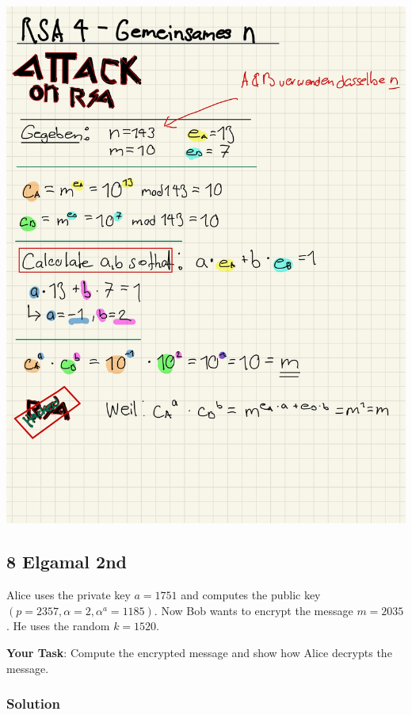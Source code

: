 \documentclass[11pt]{article}
\begin{document}
\begin{center}
	\includegraphics[scale=0.8]{img/psol5.jpg}
\end{center}

\newpage

    \hypertarget{elgamal-2nd}{%
\subsection{8 Elgamal 2nd}\label{elgamal-2nd}}

Alice uses the private key \(a=1751\) and computes the public key
\((p=2357,\alpha=2,\alpha^a =1185)\). Now Bob wants to encrypt the
message \(m = 2035\). He uses the random \(k = 1520\).

\textbf{Your Task}: Compute the encrypted message and show how Alice
decrypts the message.

\hypertarget{solution}{%
\subsubsection{Solution}\label{solution}}
\end{document}
